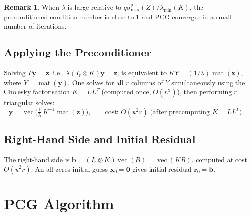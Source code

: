 \documentclass[12pt]{article}
\theoremstyle{definition}
\newtheorem{remark}[theorem]{Remark}
\DeclareMathOperator{\vecop}{vec}
\DeclareMathOperator{\mat}{mat}
\newcommand{\bz}{\mathbf{z}}
\begin{document}
\begin{remark}
  When $\lambda$ is large relative to $q\sigma_{\max}^2(Z)/\lambda_{\min}(K)$,
  the preconditioned condition number is close to $1$ and PCG converges in a
  small number of iterations.
\end{remark}

\subsection{Applying the Preconditioner}

Solving $P\mathbf{y}=\bz$, i.e., $\lambda(I_r\otimes K)\mathbf{y}=\bz$, is
equivalent to $KY = (1/\lambda)\mat(\bz)$, where $Y=\mat(\mathbf{y})$.  One
solves for all $r$ columns of $Y$ simultaneously using the Cholesky
factorisation $K=LL^T$ (computed once, $O(n^3)$), then performing $r$
triangular solves:
\begin{equation}\label{eq:precond-solve}
  \mathbf{y} = \vecop\!\bigl(\tfrac{1}{\lambda}\,K^{-1}\mat(\bz)\bigr),
  \qquad \text{cost: } O(n^2 r) \text{ (after precomputing } K=LL^T).
\end{equation}

\subsection{Right-Hand Side and Initial Residual}

The right-hand side is $\mathbf{b}=(I_r\otimes K)\vecop(B)=\vecop(KB)$, computed
at cost $O(n^2 r)$.  An all-zeros initial guess $\mathbf{x}_0=\mathbf{0}$ gives
initial residual $\mathbf{r}_0=\mathbf{b}$.

\section{PCG Algorithm}
\end{document}
